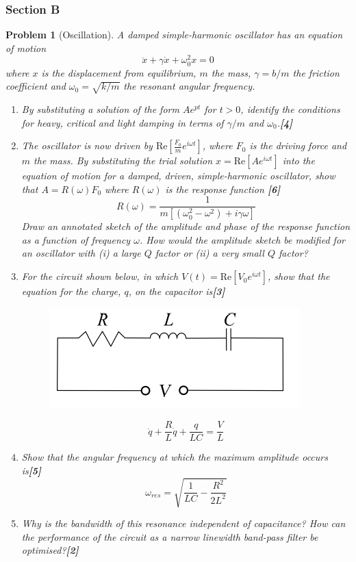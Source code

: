 \documentclass[a4paper]{article}
\theoremstyle{new}
\newtheorem{qns}{Problem}[subsection]
\begin{document}
\subsubsection{Section B}
\begin{qns}[Oscillation]
A damped simple-harmonic oscillator has an equation of motion
$$\ddot{x}+\gamma\dot{x}+\omega_0^2x=0$$
where $x$ is the displacement from equilibrium, $m$ the mass, $\gamma=b/m$ the friction coefficient and $\omega_0=\sqrt{k/m}$ the resonant angular frequency.
\begin{enumerate}[label=(\alph*)]
\item By substituting a solution of the form $Ae^{pt}$ for $t > 0$, identify the conditions for heavy, critical and light damping in terms of $\gamma/m$ and $\omega_0$.\hfill\textbf{[4]}
\item The oscillator is now driven by $\text{Re}[\frac{F_0}{m}e^{i\omega t}]$, where $F_0$ is the driving force and $m$ the mass. By substituting the trial solution $x=\text{Re}[Ae^{i\omega t}]$ into the equation of motion for a damped, driven, simple-harmonic oscillator, show that $A=R(\omega)F_0$ where $R(\omega)$ is the response function \hfill\textbf{[6]}
$$R(\omega)=\frac{1}{m[(\omega_0^2-\omega^2)+i\gamma\omega]}$$
Draw an annotated sketch of the amplitude and phase of the response function as a function of frequency $\omega$. How would the amplitude sketch be modified for an oscillator with (i) a large $Q$ factor or (ii) a very small $Q$ factor?
\item For the circuit shown below, in which $V(t) = \text{Re}[V_0e^{i\omega t}]$, show that the equation for the charge, $q$, on the capacitor is\hfill\textbf{[3]}
\begin{figure}[H]
    \centering
    \includegraphics[scale=0.7]{2018P2B6Q.PNG}
\end{figure}
$$\ddot{q}+\frac{R}{L}\dot{q}+\frac{q}{LC}=\frac{V}{L}$$
\item Show that the angular frequency at which the maximum amplitude occurs is\hfill\textbf{[5]}
$$\omega_{res}=\sqrt{\frac{1}{LC}-\frac{R^2}{2L^2}}$$
\item Why is the bandwidth of this resonance independent of capacitance? How can the performance of the circuit as a narrow linewidth band-pass filter be optimised?\hfill\textbf{[2]}
\end{enumerate}
\end{qns}
\end{document}
